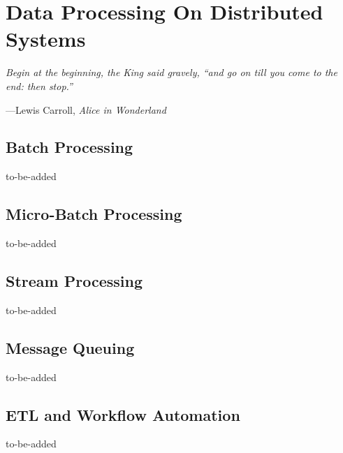 \chapter{Data Processing On Distributed Systems}
\label{chapter_data_processing}
\setlength{\epigraphwidth}{0.8\textwidth}
\setlength\epigraphrule{0pt}
\epigraph{\itshape Begin at the beginning, the King said gravely, ``and go on till you come to the end: then stop.''}{---Lewis Carroll, \textit{Alice in Wonderland}}

\section{Batch Processing}
\label{dp_batch}
to-be-added

\section{Micro-Batch Processing}
\label{dp_mb}
to-be-added

\section{Stream Processing}
\label{dp_stream}
to-be-added

\section{Message Queuing}
\label{dp_mq}
to-be-added


\section{ETL and Workflow Automation}
\label{dp_etl_wfl}
to-be-added